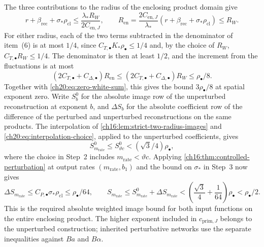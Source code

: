 The three contributions to the radius of the enclosing product domain give
\begin{equation}\label{ch20:eq:physical-enclosure}
 r+\beta_{\mathrm{rec}}+\sigma_*\rho_{\mathrm{cl}}\le\frac{\lambda_*R_W}{2C_{\mathrm{en},J}},\qquad
 R_{\mathrm{en}}=\frac{2C_{\mathrm{en},J}}{\lambda_*}(r+\beta_{\mathrm{rec}}+\sigma_*\rho_{\mathrm{cl}})\le R_W.
\end{equation}
For either radius, each of the two terms subtracted in the denominator of item~(6) is at most $1/4$, since $C_{T,\bullet}K_*\rho_\bullet\le1/4$ and, by the choice of $R_W$, $C_{T,\bullet}R_W\le1/4$. The denominator is then at least $1/2$, and the increment from the fluctuations is at most
\[
 (2C_{T,\bullet}+C_{\Delta,\bullet})R_{\mathrm{en}}\le(2C_{T,\bullet}+C_{\Delta,\bullet})R_W\le\rho_\bullet/8.
\]
Together with \eqref{ch20:eq:zero-white-sum}, this gives the bound $3\rho_\bullet/8$ at spatial exponent zero. Write $S_b^0$ for the absolute image row of the unperturbed reconstruction at exponent $b$, and $\Delta S_b$ for the absolute coefficient row of the difference of the perturbed and unperturbed reconstructions on the same products. The interpolation of \cref{ch16:lem:strict-two-radius-images} and \eqref{ch20:eq:interpolation-choice}, applied to the unperturbed coefficients, gives
\[
 S_{m_{\mathrm{rate}}}^0\le S_{\vartheta c}^0
       <(\sqrt3/4)\rho_\bullet,
\]
where the choice in Step~2 includes $m_{\mathrm{rate}}<\vartheta c$. Applying \cref{ch16:thm:controlled-perturbation} at output rates $(m_{\mathrm{rate}},b_1)$ and the bound on $\sigma_*$ in Step~3 now gives
\[
 \Delta S_{m_{\mathrm{rate}}}
       \le C_{P,\bullet}\sigma_*\rho_{\mathrm{cl}}
       \le\rho_\bullet/64,
 \qquad
 S_{m_{\mathrm{rate}}}
       \le S_{m_{\mathrm{rate}}}^0+\Delta S_{m_{\mathrm{rate}}}
       <\left(\frac{\sqrt3}{4}+\frac1{64}\right)\rho_\bullet
       <\rho_\bullet/2.
\]
This is the required absolute weighted image bound for both input functions on the entire enclosing product. The higher exponent included in $c_{\mathrm{prim},J}$ belongs to the unperturbed construction; inherited perturbative networks use the separate inequalities against $Ba$ and $B\alpha$.

